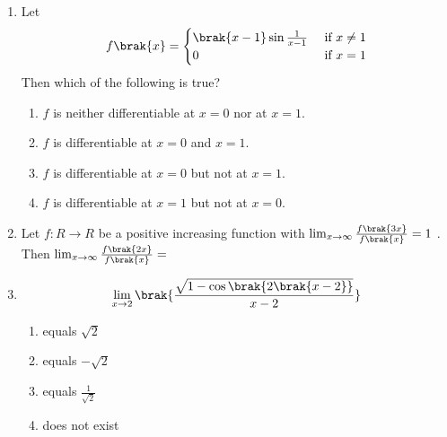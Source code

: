 \documentclass[journal,12pt,onecolumn]{IEEEtran}
\theoremstyle{remark}
\begin{document}
\begin{enumerate}
    \item Let 
         \[ f\brak{x}= \begin{cases}
     \brak{x-1}\sin\frac{1}{x-1} & \text{ if $ x\neq1 $}\\
     0 & \text{ if $ x = 1 $}
  \end{cases}
  \]
    Then which of the following is true? 
       \hfill{}
     \begin{enumerate}
     \item $f$ is neither differentiable at $x=0$ nor at $x=1$.\item $f$ is differentiable at $x=0$ and $x=1$.\item $f$ is differentiable at $x=0$ but not at $x=1$.\item $f$ is differentiable at $x=1$ but not at $x=0$.
     \end{enumerate}
    \item Let $f:R\rightarrow R$ be a positive increasing function with
     $\lim_{x\to\infty} \frac{f\brak{3x}}{f\brak{x}}=1$ . Then  $\lim_{x\to\infty} \frac{f\brak{2x}}{f\brak{x}}=$\hfill{}
     \begin{enumerate}
     \end{enumerate}
    \item  
        \[ \lim_{x\to 2} \brak{\frac{\sqrt{1-\cos\brak{2\brak{x-2}}}}{x-2}}\]
      \hfill{}
     \begin{multicols}{2}
       \begin{enumerate}
     \item equals $\sqrt{2}$ \item equals $-\sqrt{2}$ \item equals $\frac{1}{\sqrt{2}}$ \item does not exist
     \end{enumerate}  
     \end{multicols}
     

\end{enumerate}
\end{document}
